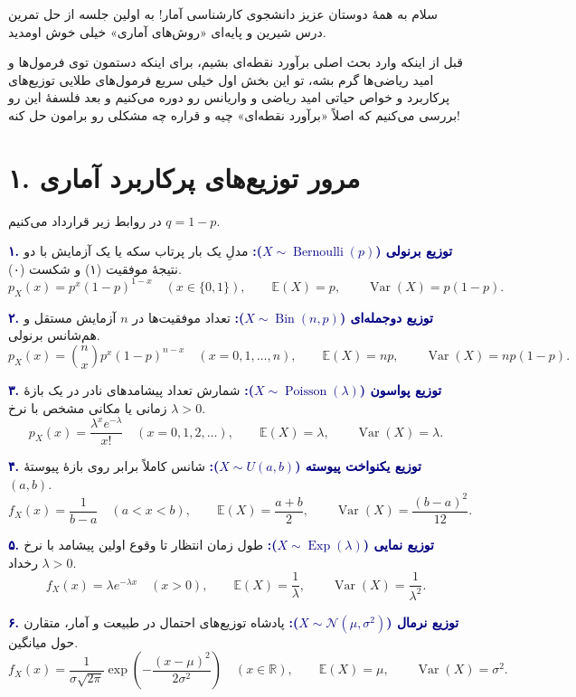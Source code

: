 \documentclass[12pt,a4paper,oneside]{report}
\newcommand{\E}{\mathbb E}
\newcommand{\Var}{\operatorname{Var}}
\newcommand{\R}{\mathbb R}
\begin{document}
سلام به همهٔ دوستان عزیز دانشجوی کارشناسی آمار! به اولین جلسه از حل تمرین درس شیرین و پایه‌ای «روش‌های آماری» خیلی خوش اومدید. 

قبل از اینکه وارد بحث اصلی برآورد نقطه‌ای بشیم، برای اینکه دستمون توی فرمول‌ها و امید ریاضی‌ها گرم بشه، تو این بخش اول خیلی سریع فرمول‌های طلایی توزیع‌های پرکاربرد و خواص حیاتی امید ریاضی و واریانس رو دوره می‌کنیم و بعد فلسفهٔ این رو بررسی می‌کنیم که اصلاً «برآورد نقطه‌ای» چیه و قراره چه مشکلی رو برامون حل کنه!

\section*{۱. مرور توزیع‌های پرکاربرد آماری}

در روابط زیر قرارداد می‌کنیم $q = 1 - p$.

\textbf{\textcolor{navy}{۱. توزیع برنولی ($X \sim \operatorname{Bernoulli}(p)$):}}
مدلِ یک بار پرتاب سکه یا یک آزمایش با دو نتیجهٔ موفقیت (۱) و شکست (۰).
\[
p_X(x) = p^x (1-p)^{1-x} \quad (x \in \{0, 1\}), \qquad \E(X) = p, \qquad \Var(X) = p(1-p).
\]

\textbf{\textcolor{navy}{۲. توزیع دوجمله‌ای ($X \sim \operatorname{Bin}(n, p)$):}}
تعداد موفقیت‌ها در $n$ آزمایش مستقل و هم‌شانس برنولی.
\[
p_X(x) = \binom{n}{x} p^x (1-p)^{n-x} \quad (x = 0, 1, \dots, n), \qquad \E(X) = np, \qquad \Var(X) = np(1-p).
\]

\textbf{\textcolor{navy}{۳. توزیع پواسون ($X \sim \operatorname{Poisson}(\lambda)$):}}
شمارش تعداد پیشامدهای نادر در یک بازهٔ زمانی یا مکانی مشخص با نرخ $\lambda > 0$.
\[
p_X(x) = \frac{\lambda^x e^{-\lambda}}{x!} \quad (x = 0, 1, 2, \dots), \qquad \E(X) = \lambda, \qquad \Var(X) = \lambda.
\]

\textbf{\textcolor{navy}{۴. توزیع یکنواخت پیوسته ($X \sim U(a, b)$):}}
شانس کاملاً برابر روی بازهٔ پیوستهٔ $(a, b)$.
\[
f_X(x) = \frac{1}{b-a} \quad (a < x < b), \qquad \E(X) = \frac{a+b}{2}, \qquad \Var(X) = \frac{(b-a)^2}{12}.
\]

\textbf{\textcolor{navy}{۵. توزیع نمایی ($X \sim \operatorname{Exp}(\lambda)$):}}
طول زمان انتظار تا وقوع اولین پیشامد با نرخ رخداد $\lambda > 0$.
\[
f_X(x) = \lambda e^{-\lambda x} \quad (x > 0), \qquad \E(X) = \frac{1}{\lambda}, \qquad \Var(X) = \frac{1}{\lambda^2}.
\]

\textbf{\textcolor{navy}{۶. توزیع نرمال ($X \sim \mathcal{N}(\mu, \sigma^2)$):}}
پادشاه توزیع‌های احتمال در طبیعت و آمار، متقارن حول میانگین.
\[
f_X(x) = \frac{1}{\sigma\sqrt{2\pi}} \exp\!\left(-\frac{(x-\mu)^2}{2\sigma^2}\right) \quad (x \in \R), \qquad \E(X) = \mu, \qquad \Var(X) = \sigma^2.
\]
\end{document}
